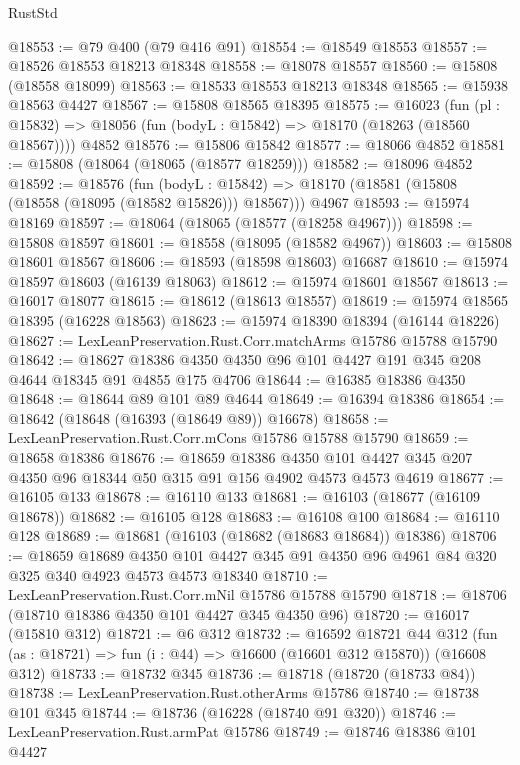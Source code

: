 \begin{lexlean}{RustStd}
\begin{coremodule}
@18553 := @79 @400 (@79 @416 @91)
@18554 := @18549 @18553
@18557 := @18526 @18553 @18213 @18348
@18558 := @18078 @18557
@18560 := @15808 (@18558 @18099)
@18563 := @18533 @18553 @18213 @18348
@18565 := @15938 @18563 @4427
@18567 := @15808 @18565 @18395
@18575 := @16023
    (fun (pl : @15832) => @18056 (fun (bodyL : @15842) => @18170 (@18263 (@18560 @18567))))
    @4852
@18576 := @15806 @15842
@18577 := @18066 @4852
@18581 := @15808 (@18064 (@18065 (@18577 @18259)))
@18582 := @18096 @4852
@18592 := @18576
    (fun (bodyL : @15842) => @18170 (@18581 (@15808 (@18558 (@18095 (@18582 @15826))) @18567)))
    @4967
@18593 := @15974 @18169
@18597 := @18064 (@18065 (@18577 (@18258 @4967)))
@18598 := @15808 @18597
@18601 := @18558 (@18095 (@18582 @4967))
@18603 := @15808 @18601 @18567
@18606 := @18593 (@18598 @18603) @16687
@18610 := @15974 @18597 @18603 (@16139 @18063)
@18612 := @15974 @18601 @18567
@18613 := @16017 @18077
@18615 := @18612 (@18613 @18557)
@18619 := @15974 @18565 @18395 (@16228 @18563)
@18623 := @15974 @18390 @18394 (@16144 @18226)
@18627 := LexLeanPreservation.Rust.Corr.matchArms @15786 @15788 @15790
@18642 := @18627 @18386 @4350 @4350 @96 @101 @4427 @191 @345 @208 @4644 @18345 @91 @4855 @175 @4706
@18644 := @16385 @18386 @4350
@18648 := @18644 @89 @101 @89 @4644
@18649 := @16394 @18386
@18654 := @18642 (@18648 (@16393 (@18649 @89)) @16678)
@18658 := LexLeanPreservation.Rust.Corr.mCons @15786 @15788 @15790
@18659 := @18658 @18386
@18676 := @18659
    @18386
    @4350
    @101
    @4427
    @345
    @207
    @4350
    @96
    @18344
    @50
    @315
    @91
    @156
    @4902
    @4573
    @4573
    @4619
@18677 := @16105 @133
@18678 := @16110 @133
@18681 := @16103 (@18677 (@16109 @18678))
@18682 := @16105 @128
@18683 := @16108 @100
@18684 := @16110 @128
@18689 := @18681 (@16103 (@18682 (@18683 @18684)) @18386)
@18706 := @18659
    @18689
    @4350
    @101
    @4427
    @345
    @91
    @4350
    @96
    @4961
    @84
    @320
    @325
    @340
    @4923
    @4573
    @4573
    @18340
@18710 := LexLeanPreservation.Rust.Corr.mNil @15786 @15788 @15790
@18718 := @18706 (@18710 @18386 @4350 @101 @4427 @345 @4350 @96)
@18720 := @16017 (@15810 @312)
@18721 := @6 @312
@18732 := @16592
    @18721
    @44
    @312
    (fun (as : @18721) => fun (i : @44) => @16600 (@16601 @312 @15870))
    (@16608 @312)
@18733 := @18732 @345
@18736 := @18718 (@18720 (@18733 @84))
@18738 := LexLeanPreservation.Rust.otherArms @15786
@18740 := @18738 @101 @345
@18744 := @18736 (@16228 (@18740 @91 @320))
@18746 := LexLeanPreservation.Rust.armPat @15786
@18749 := @18746 @18386 @101 @4427

\end{coremodule}
\end{lexlean}
